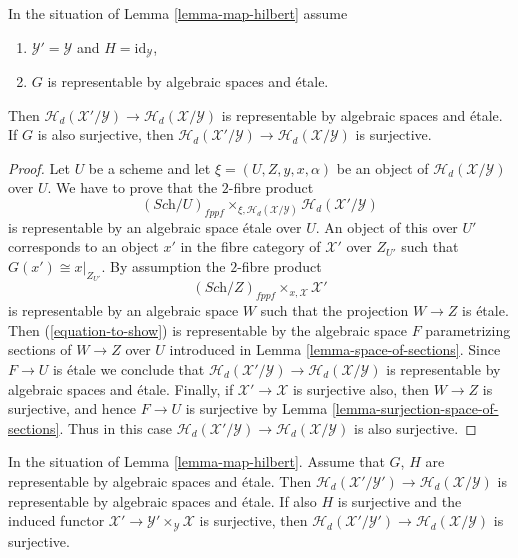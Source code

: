 \begin{lemma}
\label{lemma-etale-covering-hilbert}
In the situation of
Lemma \ref{lemma-map-hilbert}
assume
\begin{enumerate}
\item $\mathcal{Y}' = \mathcal{Y}$ and $H = \text{id}_{\mathcal{Y}}$,
\item $G$ is representable by algebraic spaces and \'etale.
\end{enumerate}
Then $\mathcal{H}_d(\mathcal{X}'/\mathcal{Y}) \to
\mathcal{H}_d(\mathcal{X}/\mathcal{Y})$ is representable by
algebraic spaces and \'etale.
If $G$ is also surjective, then
$\mathcal{H}_d(\mathcal{X}'/\mathcal{Y}) \to
\mathcal{H}_d(\mathcal{X}/\mathcal{Y})$ is surjective.
\end{lemma}

\begin{proof}
Let $U$ be a scheme and let $\xi = (U, Z, y, x, \alpha)$ be an object of
$\mathcal{H}_d(\mathcal{X}/\mathcal{Y})$ over $U$.
We have to prove that the $2$-fibre product
\begin{equation}
\label{equation-to-show}
(\textit{Sch}/U)_{fppf}
\times_{\xi, \mathcal{H}_d(\mathcal{X}/\mathcal{Y})}
\mathcal{H}_d(\mathcal{X}'/\mathcal{Y})
\end{equation}
is representable by an algebraic space \'etale over $U$.
An object of this over $U'$ corresponds to an object
$x'$ in the fibre category of $\mathcal{X}'$ over $Z_{U'}$
such that $G(x') \cong x|_{Z_{U'}}$. 
By assumption the $2$-fibre product
$$
(\textit{Sch}/Z)_{fppf} \times_{x, \mathcal{X}} \mathcal{X}'
$$
is representable by an algebraic space $W$ such that the projection
$W \to Z$ is \'etale. Then (\ref{equation-to-show})
is representable by the algebraic space $F$ parametrizing sections of
$W \to Z$ over $U$ introduced in
Lemma \ref{lemma-space-of-sections}.
Since $F \to U$ is \'etale we conclude that
$\mathcal{H}_d(\mathcal{X}'/\mathcal{Y}) \to
\mathcal{H}_d(\mathcal{X}/\mathcal{Y})$ is representable by
algebraic spaces and \'etale.
Finally, if $\mathcal{X}' \to \mathcal{X}$ is surjective also,
then $W \to Z$ is surjective, and hence $F \to U$ is surjective by
Lemma \ref{lemma-surjection-space-of-sections}.
Thus in this case
$\mathcal{H}_d(\mathcal{X}'/\mathcal{Y}) \to
\mathcal{H}_d(\mathcal{X}/\mathcal{Y})$ is also surjective.
\end{proof}

\begin{lemma}
\label{lemma-etale-map-hilbert}
In the situation of
Lemma \ref{lemma-map-hilbert}.
Assume that $G$, $H$ are representable by algebraic spaces and \'etale.
Then $\mathcal{H}_d(\mathcal{X}'/\mathcal{Y}') \to
\mathcal{H}_d(\mathcal{X}/\mathcal{Y})$ is representable by
algebraic spaces and \'etale.
If also $H$ is surjective and the induced functor
$\mathcal{X}' \to \mathcal{Y}' \times_{\mathcal{Y}} \mathcal{X}$
is surjective, then
$\mathcal{H}_d(\mathcal{X}'/\mathcal{Y}') \to
\mathcal{H}_d(\mathcal{X}/\mathcal{Y})$ is surjective.
\end{lemma}

